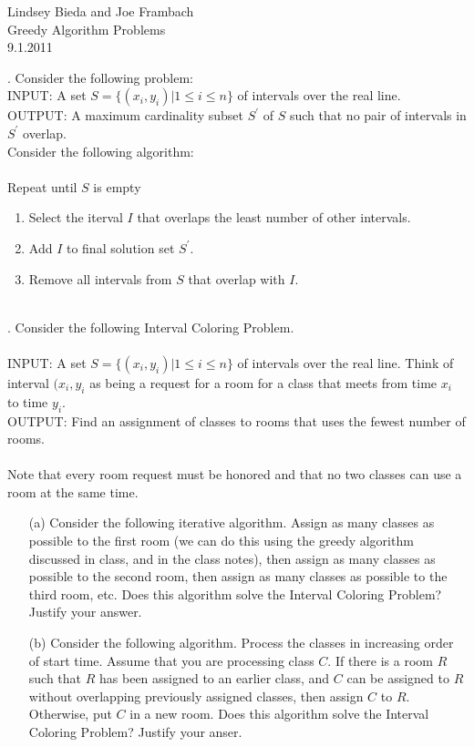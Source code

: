 \documentclass[10pt]{article}
\begin{document}
	\begin{flushright}
	Lindsey Bieda and Joe Frambach\\
	Greedy Algorithm Problems\\
	9.1.2011
	\end{flushright}
	. Consider the following problem:\\ 
	INPUT: A set $ S = \{(x_{i},y_{i})| 1\leq i \leq n\} $ of intervals over the real line.\\
	OUTPUT: A maximum cardinality subset $S^{\prime}$ of $S$ such that no pair of intervals in $S^{\prime}$ overlap. \\
	Consider the following algorithm:\\
	\\
	Repeat until $S$ is empty
	\begin{enumerate}
		\item Select the iterval $I$ that overlaps the least number of other intervals.
		\item Add $I$ to final solution set $S^{\prime}$.
		\item Remove all intervals from $S$ that overlap with $I$.
	\end{enumerate}
	\\
	. Consider the following Interval Coloring Problem.\\
	\\
	INPUT: A set $ S = \{(x_{i},y_{i})| 1\leq i \leq n\} $ of intervals over the real line. 
	Think of interval $(x_{i},y_{i}$ as being a request for a room for a class that meets from 
	time $x_{i}$ to time $y_{i}$.\\
	OUTPUT: Find an assignment of classes to rooms that uses the fewest number of rooms.\\
	\\
	Note that every room request must be honored and that no two classes can use a room at the
	same time. 

	\begin{enumerate}
		\item[(a)] Consider the following iterative algorithm. Assign as many classes as possible to the
		first room (we can do this using the greedy algorithm discussed in class, and in the class notes),
		then assign as many classes as possible to the second room, then assign as many classes as possible
		to the third room, etc. Does this algorithm solve the Interval Coloring Problem? Justify your answer.
		\item[(b)] Consider the following algorithm. Process the classes in increasing order of start time. Assume
		that you are processing class $C$. If there is a room $R$ such that $R$ has been assigned to an earlier
		class, and $C$ can be assigned to $R$ without overlapping previously assigned classes, then assign $C$ to
		$R$. Otherwise, put $C$ in a new room. Does this algorithm solve the Interval Coloring Problem? Justify your anser.
	\end{enumerate}
\end{document}
